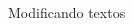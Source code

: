\begin{frame}{Modificando textos}
\begin{columns}
\begin{column}{0.5\textwidth}
    \end{column}
    \end{columns}
\end{frame}

